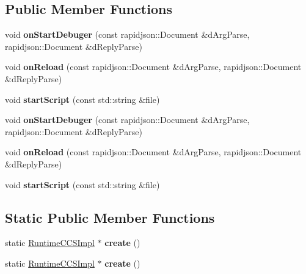 \subsection*{Public Member Functions}
\begin{DoxyCompactItemize}
\item 
\mbox{\label{classRuntimeCCSImpl_a93d58926860017b067d57799766ca88b}} 
void {\bfseries on\+Start\+Debuger} (const rapidjson\+::\+Document \&d\+Arg\+Parse, rapidjson\+::\+Document \&d\+Reply\+Parse)
\item 
\mbox{\label{classRuntimeCCSImpl_a34b1cc88e2a49b99ee4d660c71fef0ea}} 
void {\bfseries on\+Reload} (const rapidjson\+::\+Document \&d\+Arg\+Parse, rapidjson\+::\+Document \&d\+Reply\+Parse)
\item 
\mbox{\label{classRuntimeCCSImpl_ac3f75b8b66cce5e0745cdb7e40b336f7}} 
void {\bfseries start\+Script} (const std\+::string \&file)
\item 
\mbox{\label{classRuntimeCCSImpl_a93d58926860017b067d57799766ca88b}} 
void {\bfseries on\+Start\+Debuger} (const rapidjson\+::\+Document \&d\+Arg\+Parse, rapidjson\+::\+Document \&d\+Reply\+Parse)
\item 
\mbox{\label{classRuntimeCCSImpl_a34b1cc88e2a49b99ee4d660c71fef0ea}} 
void {\bfseries on\+Reload} (const rapidjson\+::\+Document \&d\+Arg\+Parse, rapidjson\+::\+Document \&d\+Reply\+Parse)
\item 
\mbox{\label{classRuntimeCCSImpl_ac3f75b8b66cce5e0745cdb7e40b336f7}} 
void {\bfseries start\+Script} (const std\+::string \&file)
\end{DoxyCompactItemize}
\subsection*{Static Public Member Functions}
\begin{DoxyCompactItemize}
\item 
\mbox{\label{classRuntimeCCSImpl_a2931c03296599ddea0a1a5fb6eb833b1}} 
static \hyperlink{classRuntimeCCSImpl}{Runtime\+C\+C\+S\+Impl} $\ast$ {\bfseries create} ()
\item 
\mbox{\label{classRuntimeCCSImpl_a513c2589e1c8e06f29112a39425d5f19}} 
static \hyperlink{classRuntimeCCSImpl}{Runtime\+C\+C\+S\+Impl} $\ast$ {\bfseries create} ()
\end{DoxyCompactItemize}
